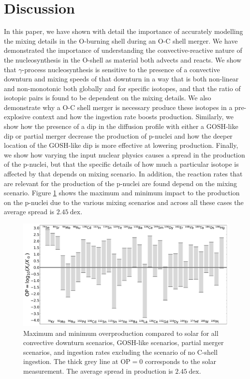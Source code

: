 \section{Discussion} \label{sec:discussion}

In this paper, we have shown with detail the importance of accurately modelling the mixing details in the O-burning shell during an O-C shell merger.
We have demonstrated the importance of understanding the convective-reactive nature of the nucleosynthesis in the O-shell as material both advects and reacts. 
We show that $\gamma$-process nucleosynthesis is sensitive to the presence of a convective downturn and mixing speeds of that downturn in a way that is both non-linear and non-monotonic both globally and for specific isotopes, and that the ratio of isotopic pairs is found to be dependent on the mixing details. 
We also demonstrate why a O-C shell merger is necessary produce these isotopes in a pre-explosive context and how the ingestion rate boosts production.
Similarly, we show how the presence of a dip in the diffusion profile with either a GOSH-like dip or partial merger decrease the production of p-nuclei and how the deeper location of the GOSH-like dip is more effective at lowering production.
Finally, we show how varying the input nuclear physics causes a spread in the production of the p-nuclei, but that the specific details of how much a particular isotope is affected by that depends on mixing scenario.
In addition, the reaction rates that are relevant for the production of the p-nuclei are found depend on the mixing scenario.
Figure \ref{fig:impact_mixing_cases_bars_all} shows the maximum and minimum impact to the production on the p-nuclei due to the various mixing scenarios and across all these cases the average spread is $2.45~\mathrm{dex}$.

\begin{figure}[!htbp]
\includegraphics[width=\textwidth]{chapters/2/figures/impact_mixing_cases_bars_all.pdf}
\caption{Maximum and minimum overproduction compared to solar for all convective downturn scenarios, GOSH-like scenarios, partial merger scenarios, and ingestion rates excluding the scenario of no C-shell ingestion. The thick grey line at $\mathrm{OP}=0$ corresponds to the solar measurement. The average spread in production is $2.45~\mathrm{dex}$.
\label{fig:impact_mixing_cases_bars_all}}
\end{figure}


